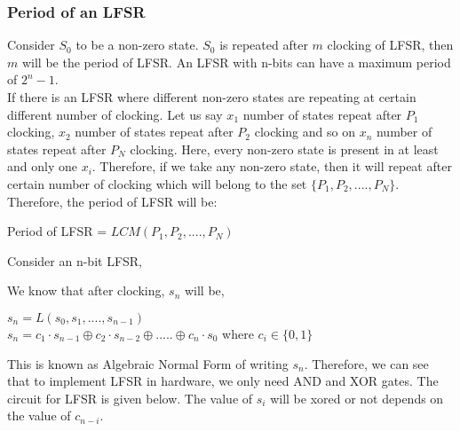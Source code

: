 \documentclass[11pt]{article}
\begin{document}
\subsubsection{Period of an LFSR} 
Consider $S_0$ to be a non-zero state. $S_0$ is repeated after $m$ clocking of LFSR, then $m$ will be the period of LFSR. An LFSR with n-bits can have a maximum period of $2^n - 1$.\\


If there is an LFSR where different non-zero states are repeating at certain different number of clocking. Let us say $x_1$ number of states repeat after $P_1$ clocking, $x_2$ number of states repeat after $P_2$ clocking and so on $x_n$ number of states repeat after $P_N$ clocking. Here, every non-zero state is present in at least and only one $x_i$. Therefore, if we take any non-zero state, then it will repeat after certain number of clocking which will belong to the set $\{P_1, P_2,...., P_N\}$. Therefore, the period of LFSR will be:
\begin{center}
    Period of LFSR = $LCM(P_1, P_2,...., P_N)$
\end{center}
Consider an n-bit LFSR,
\begin{center}
\end{center}
We know that after clocking, $s_n$ will be,
\begin{center}
    $s_n = L(s_0,s_1,...., s_{n-1})$\\
    $s_n = c_1\cdot s_{n-1} \oplus c_2 \cdot s_{n-2} \oplus ..... \oplus c_n \cdot s_0$ where $c_i \in \{0, 1\}$
\end{center}
This is known as Algebraic Normal Form of writing $s_n$. Therefore, we can see that to implement LFSR in hardware, we only need AND and XOR gates. The circuit for LFSR is given below. The value of $s_i$ will be xored or not depends on the value of $c_{n-i}$.
\end{document}

